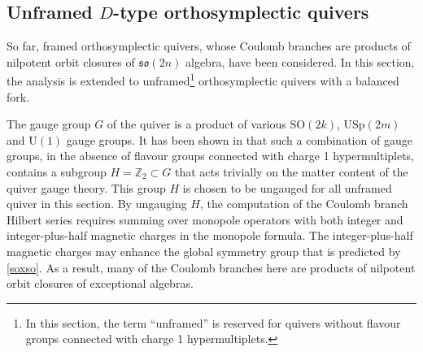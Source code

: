 \documentclass[a4paper,11pt]{article}
\newcommand{\urm}{\mathrm{U}}
\newcommand{\usprm}{\mathrm{USp}}
\newcommand{\sorm}{\mathrm{SO}}
\begin{document}
\subsection{\texorpdfstring{Unframed $D$-type orthosymplectic quivers}{Unframed D-type orthosymplectic quivers}}
\label{forkingunframed}
So far, framed orthosymplectic quivers, whose Coulomb branches are products of nilpotent orbit closures of $\mathfrak{so}(2n)$ algebra, have been considered. In this section, the analysis is extended to unframed\footnote{In this section, the term ``unframed'' is reserved for quivers without flavour groups connected with charge 1 hypermultiplets.} orthosymplectic quivers with a balanced fork.

The gauge group $G$ of the quiver is a product of various $\sorm(2k)$, $\usprm(2m)$ and $\urm(1)$ gauge groups. It has been shown in \cite{Bourget:2020xdz} that  such a combination of gauge groups, in the absence of flavour groups connected with charge 1 hypermultiplets, contains a subgroup $H=\mathbb{Z}_2\subset G$ that acts trivially on the matter content of the quiver gauge theory. This group $H$ is chosen to be ungauged for all unframed quiver in this section. By ungauging $H$, the computation of the Coulomb branch Hilbert series requires summing over monopole operators with both integer and integer-plus-half magnetic charges in the monopole formula.  The integer-plus-half magnetic charges may enhance the global symmetry group that is predicted by \eqref{soxso}. As a result, many of the Coulomb branches here are products of nilpotent orbit closures of exceptional algebras. 
\end{document}
